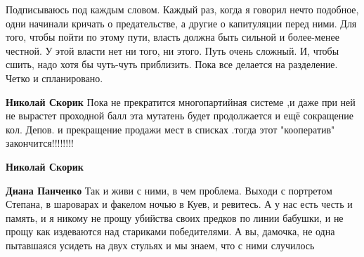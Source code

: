 \begin{itemize}
\begin{itemize}
\end{itemize}

 

Подписываюсь под каждым словом. Каждый раз, когда я говорил нечто подобное,
одни начинали кричать о предательстве, а другие о капитуляции перед ними. Для
того, чтобы пойти по этому пути, власть должна быть сильной и более-менее
честной. У этой власти нет ни того, ни этого. Путь очень сложный. И, чтобы
сшить, надо хотя бы чуть-чуть приблизить. Пока все делается на разделение.
Четко и спланировано.

\begin{itemize}
 
\textbf{Николай Скорик} Пока не прекратится многопартийная системе ,и даже при
ней не вырастет проходной балл эта мутатень будет продолжается и ещё сокращение
кол. Депов. и прекращение продажи мест в списках .тогда
этот "кооператив" закончится!!!!!!!!


 
\textbf{Николай Скорик} 🙏

 
\textbf{Диана Панченко} Так и живи с ними, в чем проблема. Выходи с портретом
Степана, в шароварах и факелом ночью в Куев, и ревитесь. А у нас есть честь и
память, и я никому не прощу убийства своих предков по линии бабушки, и не прощу
как издеваются над стариками победителями. А вы, дамочка, не одна пытавшаяся
усидеть на двух стульях и мы знаем, что с ними случилось

 

\end{itemize}
\end{itemize}

